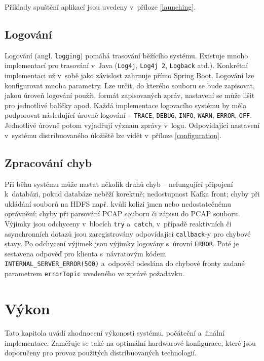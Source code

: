 Příklady spuštění aplikací jsou uvedeny v~příloze \ref{launching}.

\section{Logování}
Logování (angl. \texttt{logging}) pomáhá trasování běžícího systému. Existuje mnoho implementací pro trasování v~Java (\texttt{Log4j}, \texttt{Log4j 2}, \texttt{Logback} atd.). Konkrétní implementaci už v~sobě jako závislost zahrnuje přímo Spring Boot. Logování lze konfigurovat mnoha parametry. Lze určit, do kterého souboru se bude zapisovat, jakou úroveň logování použít, formát zapisovaných zpráv, nastavení se může lišit pro jednotlivé balíčky apod. Každá implementace logovacího systému by měla podporovat následující úrovně logování -- \texttt{TRACE}, \texttt{DEBUG}, \texttt{INFO}, \texttt{WARN}, \texttt{ERROR}, \texttt{OFF}. Jednotlivé úrovně potom vyjadřují význam zprávy v~logu. Odpovídající nastavení v~systému distribuovaného úložiště lze vidět v~příloze \ref{configuration}.

\section{Zpracování chyb}
Při běhu systému může nastat několik druhů chyb -- nefungující připojení k~databázi, pokud databáze neběží korektně; nedostupnost Kafka front; chyby při ukládání souborů na HDFS např. kvůli kolizi jmen nebo nedostatečnému oprávnění; chyby při parsování PCAP souboru či zápisu do PCAP souboru. Výjimky jsou odchyceny v~blocích \texttt{try} a~\texttt{catch}, v~případě reaktivních či asynchronních dotazů jsou zaregistrovány odpovídající \texttt{callback}-y pro chybové stavy. Po odchycení výjimek jsou výjimky logovány s~úrovní \texttt{ERROR}. Poté je sestavena odpověď pro klienta s~návratovým kódem \texttt{INTERNAL\_SERVER\_ERROR(500)} a~odpověď odeslána do chybové fronty zadané parametrem \texttt{errorTopic} uvedeného ve zprávě požadavku.

\chapter{Výkon} \label{chapter_performance}
Tato kapitola uvádí zhodnocení výkonosti systému, počáteční a~finální implementace. Zaměřuje se také na optimální hardwarové konfigurace, které jsou doporučeny pro provoz použitých distribuovaných technologií.

